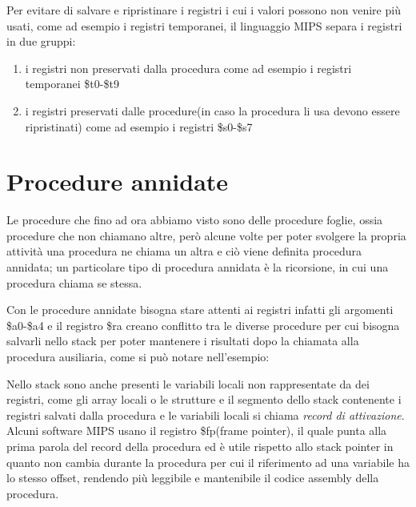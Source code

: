 
Per evitare di salvare e ripristinare i registri i cui i valori possono non venire
più usati, come ad esempio i registri temporanei, il linguaggio MIPS separa i registri in due gruppi:
\begin{enumerate}
  \item i registri non preservati dalla procedura come ad esempio i registri temporanei \$t0-\$t9
  \item i registri preservati dalle procedure(in caso la procedura li usa devono essere ripristinati)
        come ad esempio i registri \$s0-\$s7
\end{enumerate}

\section{Procedure annidate}
Le procedure che fino ad ora abbiamo visto sono delle procedure foglie, ossia procedure
che non chiamano altre, però alcune volte per poter svolgere la propria attività
una procedura ne chiama un altra e ciò viene definita procedura annidata; un particolare
tipo di procedura annidata è la ricorsione, in cui una procedura chiama se stessa.

Con le procedure annidate bisogna stare attenti ai registri infatti gli argomenti
\$a0-\$a4 e il registro \$ra creano conflitto tra le diverse procedure per cui bisogna
salvarli nello stack per poter mantenere i risultati dopo la chiamata alla procedura ausiliaria,
come si può notare nell'esempio:

Nello stack sono anche presenti le variabili locali non rappresentate da dei registri,
come gli array locali o le strutture e il segmento dello stack contenente
i registri salvati dalla procedura e le variabili locali si chiama \emph{record di attivazione}.
Alcuni software MIPS usano il registro \$fp(frame pointer), il quale punta alla prima
parola del record della procedura ed è utile rispetto allo stack pointer in quanto
non cambia durante la procedura per cui il riferimento ad una variabile ha lo stesso offset,
rendendo più leggibile e mantenibile il codice assembly della procedura.
